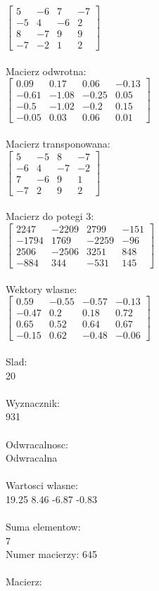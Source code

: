 \documentclass[a4paper,12pt]{article}
\begin{document}
$\begin{bmatrix} 5&-6&7&-7\\-5&4&-6&2\\8&-7&9&9\\-7&-2&1&2 \end{bmatrix}$
\\
\\
Macierz odwrotna:\\

$\begin{bmatrix} 0.09&0.17&0.06&-0.13\\-0.61&-1.08&-0.25&0.05\\-0.5&-1.02&-0.2&0.15\\-0.05&0.03&0.06&0.01 \end{bmatrix}$
\\
\\
Macierz transponowana:\\

$\begin{bmatrix} 5&-5&8&-7\\-6&4&-7&-2\\7&-6&9&1\\-7&2&9&2 \end{bmatrix}$
\\
\\
Macierz do potegi 3:\\

$\begin{bmatrix} 2247&-2209&2799&-151\\-1794&1769&-2259&-96\\2506&-2506&3251&848\\-884&344&-531&145 \end{bmatrix}$
\\
\\
Wektory wlasne:\\

$\begin{bmatrix} 0.59&-0.55&-0.57&-0.13\\-0.47&0.2&0.18&0.72\\0.65&0.52&0.64&0.67\\-0.15&0.62&-0.48&-0.06 \end{bmatrix}$
\\
\\
Slad:\\
20
\\
\\
Wyznacznik:\\
931
\\
\\
Odwracalnosc:\\
Odwracalna
\\
\\
Wartosci wlasne:\\
19.25 8.46 -6.87 -0.83
\\
\\
Suma elementow:\\
7
\\
\newpage
Numer macierzy:
645
\\
\\
Macierz:\\
\end{document}
